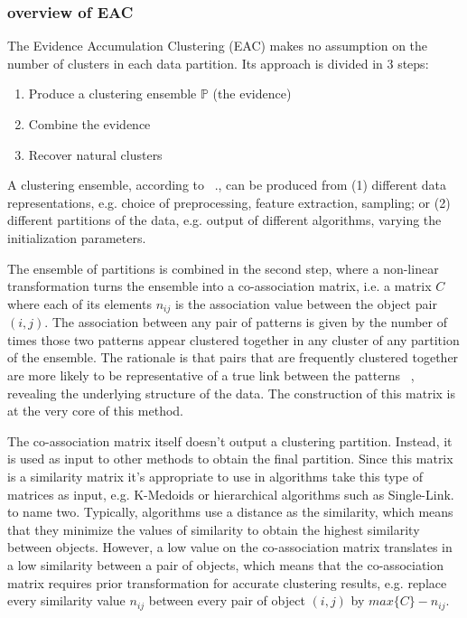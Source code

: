 \subsubsection{overview of EAC} 
The Evidence Accumulation Clustering (EAC) makes no assumption on the number of clusters in each data partition. Its approach is divided in 3 steps:

\begin{enumerate}
\item Produce a clustering ensemble $\mathbb{P}$ (the evidence)
\item Combine the evidence
\item Recover natural clusters 
\end{enumerate}

A clustering ensemble, according to ~\cite{Fred2005}., can be produced from (1) different data representations, e.g. choice of preprocessing, feature extraction, sampling; or (2) different partitions of the data, e.g. output of different algorithms, varying the initialization parameters.

The ensemble of partitions is combined in the second step, where a non-linear transformation turns the ensemble into a co-association matrix, i.e. a matrix $C$ where each of its elements $n_{ij}$ is the association value between the object pair $(i,j)$. The association between any pair of patterns is given by the number of times those two patterns appear clustered together in any cluster of any partition of the ensemble. The rationale is that pairs that are frequently clustered together are more likely to be representative of a true link between the patterns ~\cite{Fred2005}, revealing the underlying structure of the data.
The construction of this matrix is at the very core of this method.

The co-association matrix itself doesn't output a clustering partition. Instead, it is used as input to other methods to obtain the final partition. Since this matrix is a similarity matrix it's appropriate to use in algorithms take this type of matrices as input, e.g. K-Medoids or hierarchical algorithms such as Single-Link. to name two. Typically, algorithms use a distance as the similarity, which means that they minimize the values of similarity to obtain the highest similarity between objects. However, a low value on the co-association matrix translates in a low similarity between a pair of objects, which means that the co-association matrix requires prior transformation for accurate clustering results, e.g. replace every similarity value $n_{ij}$ between every pair of object $(i,j)$ by $max \{ C \} - n_{ij}$.


